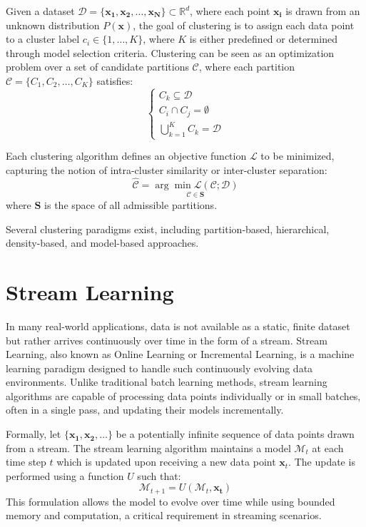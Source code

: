 Given a dataset $\mathcal{D} = \{\mathbf{x_1, x_2, \ldots, x_N} \} \subset
    \mathbb{R}^d$, where each point $\mathbf{x_i}$ is drawn from an unknown
distribution $P(\mathbf{x})$, the goal of clustering is to assign each data
point to a cluster label $c_i \in \{1,\ldots, K\}$, where $K$ is either
predefined or determined through model selection criteria. Clustering can be
seen as an optimization problem over a set of candidate partitions
$\mathcal{C}$, where each partition $\mathcal{C} = \{ C_1, C_2, \ldots, C_K\}$
satisfies: 
\[
    \begin{cases}
        C_k \subseteq \mathcal{D} \\
        C_i \cap C_j = \emptyset  \\
        \bigcup^K_{k=1} C_k = \mathcal{D}
    \end{cases}
\]

Each clustering algorithm defines an objective function $\mathcal{L}$ to be
minimized, capturing the notion of intra-cluster similarity or inter-cluster
separation: 
\[ 
    \hat{\mathcal{C}} = \underset{\mathcal{C} \in
        \mathbf{S}}{\arg\min \mathcal{L}(\mathcal{C;D})} 
\] 
where $\mathbf{S}$ is the space of all admissible partitions.

Several clustering paradigms exist, including partition-based, hierarchical,
density-based, and model-based approaches.

\section{Stream Learning}\label{sec:stream_learning}
In many real-world applications, data is not available as a static, finite dataset but rather arrives continuously over time in the form of a stream. Stream Learning, also known as Online Learning or Incremental Learning, is a machine learning paradigm designed to handle such continuously evolving data environments. Unlike traditional batch learning methods, stream learning algorithms are capable of processing data points individually or in small batches, often in a single pass, and updating their models incrementally.

Formally, let $\{\mathbf{x_1, x_2,\ldots} \} $ be a potentially infinite sequence
of data points drawn from a stream. The stream learning algorithm maintains a
model $\mathcal{M}_t$ at each time step $t$ which is updated upon receiving a
new data point $\mathbf{x}_t$. The update is performed using a function $U$
such that: 
\[ 
    \mathcal{M}_{t+1} = U(\mathcal{M}_t, \mathbf{x_t}) 
\] 
This formulation allows the model to evolve over time while using bounded
memory and computation, a critical requirement in streaming scenarios.

